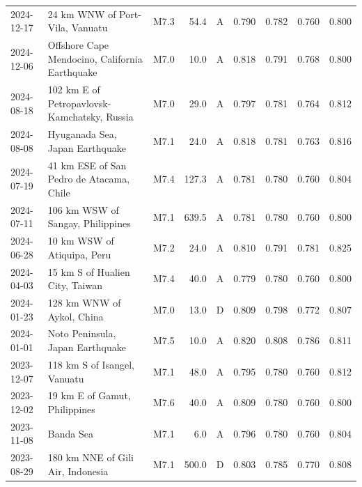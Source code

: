 \documentclass[preprint,review,12pt,authoryear]{elsarticle}
\begin{document}
\begin{table}[p]
{\begin{tabular}{@{}lllrcrrrr@{}}
2024-12-17 & 24 km WNW of Port-Vila, Vanuatu                      & M7.3 & 54.4  & A & 0.790 & 0.782 & 0.760 & 0.800 \\
2024-12-06 & Offshore Cape Mendocino, California Earthquake       & M7.0 & 10.0  & A & 0.818 & 0.791 & 0.768 & 0.800 \\
2024-08-18 & 102 km E of Petropavlovsk-Kamchatsky, Russia         & M7.0 & 29.0  & A & 0.797 & 0.781 & 0.764 & 0.812 \\
2024-08-08 & Hyuganada Sea, Japan Earthquake                      & M7.1 & 24.0  & A & 0.818 & 0.781 & 0.763 & 0.816 \\
2024-07-19 & 41 km ESE of San Pedro de Atacama, Chile             & M7.4 & 127.3 & A & 0.781 & 0.780 & 0.760 & 0.804 \\
2024-07-11 & 106 km WSW of Sangay, Philippines                    & M7.1 & 639.5 & A & 0.781 & 0.780 & 0.760 & 0.800 \\
2024-06-28 & 10 km WSW of Atiquipa, Peru                          & M7.2 & 24.0  & A & 0.810 & 0.791 & 0.781 & 0.825 \\
2024-04-03 & 15 km S of Hualien City, Taiwan                      & M7.4 & 40.0  & A & 0.779 & 0.780 & 0.760 & 0.800 \\
2024-01-23 & 128 km WNW of Aykol, China                           & M7.0 & 13.0  & D & 0.809 & 0.798 & 0.772 & 0.807 \\
2024-01-01 & Noto Peninsula, Japan Earthquake                     & M7.5 & 10.0  & A & 0.820 & 0.808 & 0.786 & 0.811 \\
2023-12-07 & 118 km S of Isangel, Vanuatu                         & M7.1 & 48.0  & A & 0.795 & 0.780 & 0.760 & 0.812 \\
2023-12-02 & 19 km E of Gamut, Philippines                        & M7.6 & 40.0  & A & 0.809 & 0.780 & 0.760 & 0.800 \\
2023-11-08 & Banda Sea                                            & M7.1 & 6.0   & A & 0.796 & 0.780 & 0.760 & 0.804 \\
2023-08-29 & 180 km NNE of Gili Air, Indonesia                    & M7.1 & 500.0 & D & 0.803 & 0.785 & 0.770 & 0.808 \\
\bottomrule
\end{tabular}%
}
\end{table}
\clearpage
\end{document}
